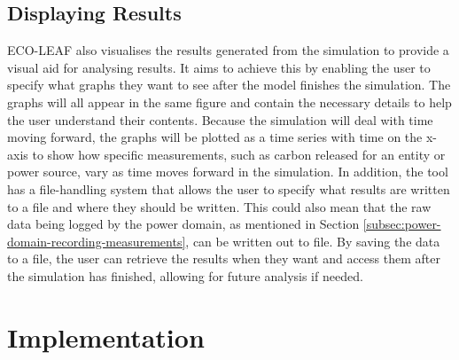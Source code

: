\documentclass{l4proj}
\begin{document}
\section{Displaying Results}\label{sec:displaying results}
ECO-LEAF also visualises the results generated from the simulation to provide a visual aid for analysing results.
It aims to achieve this by enabling the user to specify what graphs they want to see after the model finishes the simulation.
The graphs will all appear in the same figure and contain the necessary details to help the user understand their contents.
Because the simulation will deal with time moving forward, the graphs will be plotted as a time series with time on the x-axis to show how specific measurements, such as carbon released for an entity or power source, vary as time moves forward in the simulation.
In addition, the tool has a file-handling system that allows the user to specify what results are written to a file and where they should be written.
This could also mean that the raw data being logged by the power domain, as mentioned in Section \ref{subsec:power-domain-recording-measurements}, can be written out to file.
By saving the data to a file, the user can retrieve the results when they want and access them after the simulation has finished, allowing for future analysis if needed.
\chapter{Implementation}\label{chp:imp}

\end{document}
